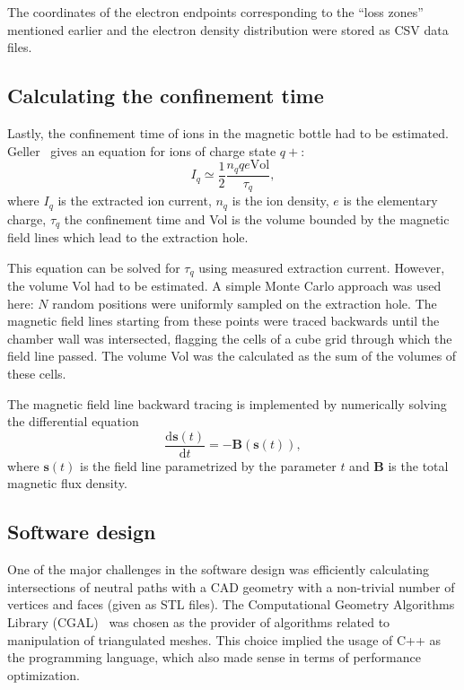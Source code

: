 \documentclass[a4paper,twoside,12pt]{article}
\begin{document}
The coordinates of the electron endpoints corresponding to the ``loss zones'' mentioned earlier and the electron density distribution were stored as CSV data files.

\subsection{Calculating the confinement time}
\label{sec:confinement}
Lastly, the confinement time of ions in the magnetic bottle had to be estimated. Geller~\cite{geller:ecr} gives an equation for ions of charge state $q+$:
\begin{equation}
    \label{eq:confinement_time}
    I_q \simeq \frac{1}{2} \frac{n_q q e \mathrm{Vol}}{\tau_q},
\end{equation}
where $I_q$ is the extracted ion current, $n_q$ is the ion density, $e$ is the elementary charge, $\tau_q$ the confinement time and Vol is the volume bounded by the magnetic field lines which lead to the extraction hole.

This equation can be solved for $\tau_q$ using measured extraction current. However, the volume Vol had to be estimated. A simple Monte Carlo approach was used here: $N$ random positions were uniformly sampled on the extraction hole. The magnetic field lines starting from these points were traced backwards until the chamber wall was intersected, flagging the cells of a cube grid through which the field line passed. The volume Vol was the calculated as the sum of the volumes of these cells.

The magnetic field line backward tracing is implemented by numerically solving the differential equation
\begin{equation}
    \frac{\mathrm{d}\mathbf{s}(t)}{\mathrm{d}t} = -\mathbf{B}(\mathbf{s}(t)),
\end{equation}
where $\mathbf{s}(t)$ is the field line parametrized by the parameter $t$ and $\mathbf{B}$ is the total magnetic flux density.

\subsection{Software design}
One of the major challenges in the software design was efficiently calculating intersections of neutral paths with a CAD geometry with a non-trivial number of vertices and faces (given as STL files). The Computational Geometry Algorithms Library (\textsc{CGAL})~\cite{cgal} was chosen as the provider of algorithms related to manipulation of triangulated meshes. This choice implied the usage of \textsc{C++} as the programming language, which also made sense in terms of performance optimization.
\end{document}
